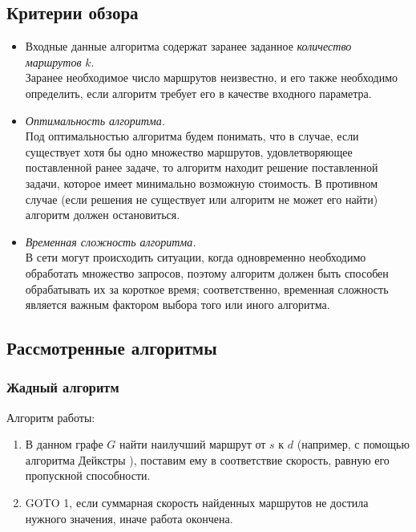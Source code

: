 \documentclass[a4paper]{article}
\begin{document}
\subsection{Критерии обзора}
\begin{itemize}
\item Входные данные алгоритма содержат заранее заданное \textit{количество маршрутов} $k$.\\ Заранее необходимое число маршрутов неизвестно, и его также необходимо определить, если алгоритм требует его в качестве входного параметра.
\item \textit{Оптимальность алгоритма.}\\ Под оптимальностью алгоритма будем понимать, что в случае, если существует хотя бы одно множество маршрутов, удовлетворяющее поставленной ранее задаче, то алгоритм находит решение поставленной задачи, которое имеет минимально возможную стоимость. В противном случае (если решения не существует или алгоритм не может его найти) алгоритм должен остановиться.
\item \textit{Временная сложность алгоритма.}\\ В сети могут происходить ситуации, когда одновременно необходимо обработать множество запросов, поэтому алгоритм должен быть способен обрабатывать их за короткое время; соответственно, временная сложность является важным фактором выбора того или иного алгоритма. 
\end{itemize}
\subsection{Рассмотренные алгоритмы}

\subsubsection{Жадный алгоритм}
Алгоритм работы:
\begin{enumerate}
\item В данном графе $G$ найти наилучший маршрут от $s$ к $d$ (например, с помощью алгоритма Дейкстры \cite{dijkstra}), поставим ему в соответствие скорость, равную его пропускной способности.
\item GOTO 1, если суммарная скорость найденных маршрутов не достила нужного значения, иначе работа окончена.
\end{enumerate}
\end{document}
